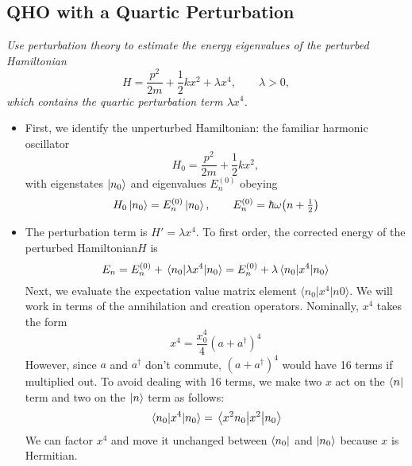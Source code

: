 \documentclass[11pt, a4paper]{article}
\newcommand{\Ham}{Hamiltonian\xspace}
\newcommand{\bmel}[3]{\big \langle {#1} \big | {#2} \big | {#3} \big \rangle}  %
\begin{document}
\subsection{QHO with a Quartic Perturbation}
\textit{Use perturbation theory to estimate the energy eigenvalues of the perturbed Hamiltonian}
\begin{equation*}
	H = \frac{p^{2}}{2m} + \frac{1}{2}kx^{2} + \lambda x^{4}, \qquad \lambda > 0,
\end{equation*}
\textit{which contains the quartic perturbation term $ \lambda x^{4} $.}

\begin{itemize}
	
	\item First, we identify the unperturbed Hamiltonian: the familiar harmonic oscillator
	\begin{equation*}
		H_{0} = \frac{p^{2}}{2m} + \frac{1}{2}kx^{2},
	\end{equation*}
	with eigenstates $ \ket{n_{0}} $ and eigenvalues $ E^{(0)}_{n} $ obeying
	\begin{equation*}
		H_{0} \ket{n_{0}} = E^{(0)}_{n} \ket{n_{0}}, \qquad E^{(0)}_{n} = \hbar \omega \big(n + \tfrac{1}{2}\big)
	\end{equation*}
	
	\item The perturbation term is $ H' = \lambda x^{4} $. To first order, the corrected energy of the perturbed \Ham $ H $ is
	\begin{equation*}
		E_{n} = E^{(0)}_{n} + \mel{n_{0}}{\lambda x^{4}}{n_{0}} = E^{(0)}_{n} + \lambda \mel{n_{0}}{x^{4}}{n_{0}}
	\end{equation*}
	Next, we evaluate the expectation value matrix element $ \bmel{n_{0}}{x^{4}}{n0} $. We will work in terms of the annihilation and creation operators. Nominally, $ x^{4} $ takes the form
	\begin{equation*}
		x^{4} = \frac{x_{0}^{4}}{4}(a+a^{\dagger})^{4} 
	\end{equation*}
	However, since $ a $ and $ a^{\dagger} $ don't commute, $ (a+a^{\dagger})^{4} $ would have 16 terms if multiplied out.  To avoid dealing with 16 terms, we make two $ x $ act on the $ \bra{n} $ term and two on the $ \ket{n} $ term as follows:
	\begin{equation*}
		\mel{n_{0}}{x^{4}}{n_{0}} = \mel{x^{2}n_{0}}{x^{2}}{n_{0}}
	\end{equation*}
	We can factor $ x^{4} $ and move it unchanged between $ \bra{n_{0}} $ and $ \ket{n_{0}} $ because $ x $ is Hermitian.
	

\end{itemize}
\end{document}
